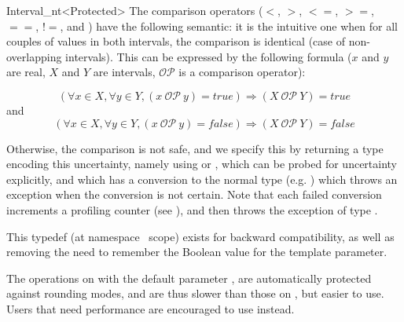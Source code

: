 \begin{ccRefClass}{Interval_nt<Protected>}
The comparison operators ($<$, $>$, $<=$, $>=$, $==$, $!=$, 
and ) have the following semantic: it is the intuitive
one when for all couples of values in both intervals, the comparison
is identical (case of non-overlapping intervals).  This can be expressed
by the following formula ($x$ and $y$ are real, $X$ and $Y$ are
intervals, $\mathcal{OP}$ is a comparison operator):

$$
\left(\forall x \in X, \forall y \in Y, (x\ \mathcal{OP}\ y) = true\right)
\Rightarrow (X\ \mathcal{OP}\ Y) = true
$$
and
$$
\left(\forall x \in X, \forall y \in Y, (x\ \mathcal{OP}\ y) = false\right)
\Rightarrow (X\ \mathcal{OP}\ Y) =false
$$

Otherwise, the comparison is not safe, and we specify this by returning
a type encoding this uncertainty, namely using 
or , which
can be probed for uncertainty explicitly, and which has a conversion to
the normal type (e.g. ) which throws an exception when the
conversion is not certain.  Note that each failed conversion increments
a profiling counter (see ), and then throws the exception of
type .

\ccGlue
{}
\ccGlue
{}
\ccGlue
{}
\ccGlue
{}
\ccGlue
{}
\ccGlue
{}
\ccGlue
{}

{This typedef (at namespace \cgal\ scope) exists for backward compatibility,
 as well as removing the need to remember the Boolean value for the template
 parameter.}

\begin{ccAdvanced}

\ccImplementation

The operations on  with the default parameter ,
are automatically protected against rounding modes, and are thus slower than
those on , but easier to use.  Users that need
performance are encouraged to use  instead.


\end{ccAdvanced}
\end{ccRefClass}
